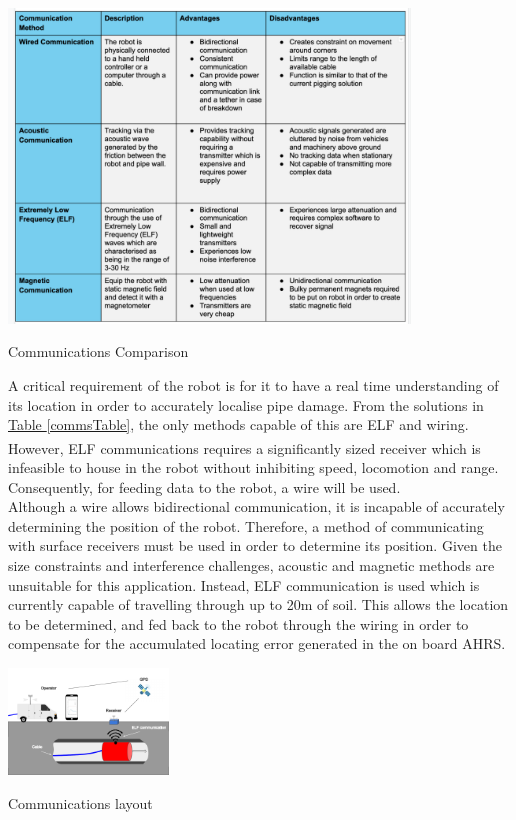 \documentclass[11pt]{article}		%
\newcommand{\supercite}[1]{\textsuperscript{\cite{#1}}}		%
\newcommand{\tableref}[1]{\hyperref[#1]{Table \ref*{#1}}}     %
\begin{document}
	        \begin{table}[h]
				\centering
				\includegraphics[width=0.8\textwidth]{commscomparison}
				\caption{Communications Comparison}
				\label{commsTable}
			\end{table}
			
	     	A critical requirement of the robot is for it to have a real time understanding of its location in order to accurately localise pipe damage. 
	     	From the solutions in \tableref{commsTable}, the only methods capable of this are ELF and wiring. 
	     	However, ELF communications requires a significantly sized receiver\supercite{elfreceiversize} which is infeasible to house in the robot without inhibiting speed, locomotion and range. 
	     	Consequently, for feeding data to the robot, a wire will be used.
	        \\ 
	        \hspace*{3ex}Although a wire allows bidirectional communication, it is incapable of accurately determining the position of the robot. 
	        Therefore, a method of communicating with surface receivers must be used in order to determine its position. 
	        Given the size constraints and interference challenges, acoustic and magnetic methods are unsuitable for this application. 
	        Instead, ELF communication is used which is currently capable of travelling through up to 20m of soil. 
	        This allows the location to be determined, and fed back to the robot through the wiring in order to compensate for the accumulated locating error generated in the on board AHRS.
	        
	        \begin{floatingfigure}[r]{0.35\textwidth}
				\centering
				\includegraphics[width=0.32\textwidth]{comms layout}
				\caption{Communications layout}
				\label{commsLayout}
			\end{floatingfigure}
	         
\end{document}
